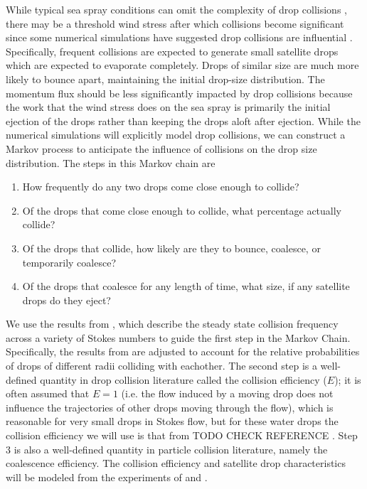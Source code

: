 \documentclass[10pt,a4paper]{article}
\begin{document}
While typical sea spray conditions can omit the complexity of drop collisions \citep{Veron2015}, there may be a threshold wind stress after which collisions become significant since some numerical simulations have suggested drop collisions are influential \citep{Shpund2014}. Specifically, frequent collisions are expected to generate small satellite drops which are expected to evaporate completely. Drops of similar size are much more likely to bounce apart, maintaining the initial drop-size distribution. The momentum flux should be less significantly impacted by drop collisions because the work that the wind stress does on the sea spray is primarily the initial ejection of the drops rather than keeping the drops aloft after ejection. While the numerical simulations will explicitly model drop collisions, we can construct a Markov process to anticipate the influence of collisions on the drop size distribution. The steps in this Markov chain are 
\begin{enumerate}
\item How frequently do any two drops come close enough to collide?\label{MC:1}
\item Of the drops that come close enough to collide, what percentage actually collide?
\item Of the drops that collide, how likely are they to bounce, coalesce, or temporarily coalesce?
\item Of the drops that coalesce for any length of time, what size, if any satellite drops do they eject?
\end{enumerate}
We use the results from \citet{Choi2016}, which describe the steady state collision frequency across a variety of Stokes numbers to guide the first step in the Markov Chain. Specifically, the results from \citet{Choi2016} are adjusted to account for the relative probabilities of drops of different radii colliding with eachother. The second step is a well-defined quantity in drop collision literature called the collision efficiency ($E$); it is often assumed that $E=1$ (i.e. the flow induced by a moving drop does not influence the trajectories of other drops moving through the flow), which is reasonable for very small drops in Stokes flow, but for these water drops the collision efficiency we will use is that from TODO CHECK REFERENCE \citet{Ochs1994}. Step 3 is also a well-defined quantity in particle collision literature, namely the coalescence efficiency. The collision efficiency and satellite drop characteristics will be modeled from the experiments of \citet{Beard1995} and \citet{Beard2001}.
\end{document}
